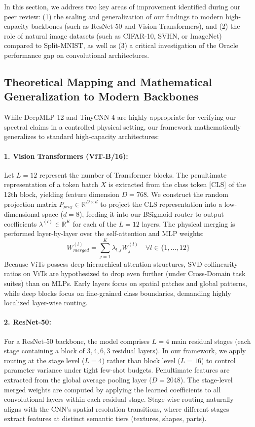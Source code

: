 In this section, we address two key areas of improvement identified during our peer review: (1) the scaling and generalization of our findings to modern high-capacity backbones (such as ResNet-50 and Vision Transformers), and (2) the role of natural image datasets (such as CIFAR-10, SVHN, or ImageNet) compared to Split-MNIST, as well as (3) a critical investigation of the Oracle performance gap on convolutional architectures.

\subsection{Theoretical Mapping and Mathematical Generalization to Modern Backbones}

While DeepMLP-12 and TinyCNN-4 are highly appropriate for verifying our spectral claims in a controlled physical setting, our framework mathematically generalizes to standard high-capacity architectures:

\paragraph{1. Vision Transformers (ViT-B/16):} 
Let $L=12$ represent the number of Transformer blocks. The penultimate representation of a token batch $X$ is extracted from the class token [CLS] of the 12th block, yielding feature dimension $D=768$. We construct the random projection matrix $P_{proj} \in \mathbb{R}^{D \times d}$ to project the CLS representation into a low-dimensional space ($d=8$), feeding it into our BSigmoid router to output coefficients $\lambda^{(l)} \in \mathbb{R}^K$ for each of the $L=12$ layers. The physical merging is performed layer-by-layer over the self-attention and MLP weights:
$$W_{merged}^{(l)} = \sum_{j=1}^K \lambda_{l, j} W_j^{(l)} \quad \forall l \in \{1, \dots, 12\}$$
Because ViTs possess deep hierarchical attention structures, SVD collinearity ratios on ViTs are hypothesized to drop even further (under Cross-Domain task suites) than on MLPs. Early layers focus on spatial patches and global patterns, while deep blocks focus on fine-grained class boundaries, demanding highly localized layer-wise routing.

\paragraph{2. ResNet-50:}
For a ResNet-50 backbone, the model comprises $L=4$ main residual stages (each stage containing a block of $3, 4, 6, 3$ residual layers). In our framework, we apply routing at the stage level ($L=4$) rather than block level ($L=16$) to control parameter variance under tight few-shot budgets. Penultimate features are extracted from the global average pooling layer ($D=2048$). The stage-level merged weights are computed by applying the learned coefficients to all convolutional layers within each residual stage. Stage-wise routing naturally aligns with the CNN's spatial resolution transitions, where different stages extract features at distinct semantic tiers (textures, shapes, parts).

